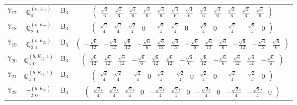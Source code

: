 \documentclass[fleqn,10pt,landscape]{article}
\begin{document}
\begin{itemize}
\begin{center}
\begin{longtable}{c|c|c|c}
$ \mathbb{Y}_{17} $ & $\mathbb{Q}_{0}^{(b,A_{1g})}$ & B$_{3}$ & $\begin{pmatrix} \frac{\sqrt{3}}{6} & \frac{\sqrt{3}}{6} & \frac{\sqrt{3}}{6} & \frac{\sqrt{3}}{6} & \frac{\sqrt{3}}{6} & \frac{\sqrt{3}}{6} & \frac{\sqrt{3}}{6} & \frac{\sqrt{3}}{6} & \frac{\sqrt{3}}{6} & \frac{\sqrt{3}}{6} & \frac{\sqrt{3}}{6} & \frac{\sqrt{3}}{6} \end{pmatrix}$ \\
$ \mathbb{Y}_{18} $ & $\mathbb{Q}_{2,0}^{(b,E_{2g})}$ & B$_{3}$ & $\begin{pmatrix} \frac{\sqrt{2}}{4} & \frac{\sqrt{2}}{4} & \frac{\sqrt{2}}{4} & 0 & - \frac{\sqrt{2}}{4} & \frac{\sqrt{2}}{4} & 0 & - \frac{\sqrt{2}}{4} & 0 & - \frac{\sqrt{2}}{4} & - \frac{\sqrt{2}}{4} & 0 \end{pmatrix}$ \\
$ \mathbb{Y}_{19} $ & $\mathbb{Q}_{2,1}^{(b,E_{2g})}$ & B$_{3}$ & $\begin{pmatrix} - \frac{\sqrt{6}}{12} & - \frac{\sqrt{6}}{12} & \frac{\sqrt{6}}{12} & - \frac{\sqrt{6}}{6} & \frac{\sqrt{6}}{12} & \frac{\sqrt{6}}{12} & - \frac{\sqrt{6}}{6} & \frac{\sqrt{6}}{12} & \frac{\sqrt{6}}{6} & - \frac{\sqrt{6}}{12} & - \frac{\sqrt{6}}{12} & \frac{\sqrt{6}}{6} \end{pmatrix}$ \\
$ \mathbb{Y}_{20} $ & $\mathbb{Q}_{4,0}^{(b,E_{2g},1)}$ & B$_{3}$ & $\begin{pmatrix} \frac{\sqrt{6}}{12} & \frac{\sqrt{6}}{12} & \frac{\sqrt{6}}{12} & - \frac{\sqrt{6}}{6} & \frac{\sqrt{6}}{12} & \frac{\sqrt{6}}{12} & - \frac{\sqrt{6}}{6} & \frac{\sqrt{6}}{12} & - \frac{\sqrt{6}}{6} & \frac{\sqrt{6}}{12} & \frac{\sqrt{6}}{12} & - \frac{\sqrt{6}}{6} \end{pmatrix}$ \\
$ \mathbb{Y}_{21} $ & $\mathbb{Q}_{4,1}^{(b,E_{2g},1)}$ & B$_{3}$ & $\begin{pmatrix} \frac{\sqrt{2}}{4} & \frac{\sqrt{2}}{4} & - \frac{\sqrt{2}}{4} & 0 & \frac{\sqrt{2}}{4} & - \frac{\sqrt{2}}{4} & 0 & \frac{\sqrt{2}}{4} & 0 & - \frac{\sqrt{2}}{4} & - \frac{\sqrt{2}}{4} & 0 \end{pmatrix}$ \\
$ \mathbb{Y}_{22} $ & $\mathbb{T}_{2,0}^{(b,E_{2g})}$ & B$_{3}$ & $\begin{pmatrix} \frac{\sqrt{2} i}{4} & \frac{\sqrt{2} i}{4} & \frac{\sqrt{2} i}{4} & 0 & - \frac{\sqrt{2} i}{4} & \frac{\sqrt{2} i}{4} & 0 & - \frac{\sqrt{2} i}{4} & 0 & - \frac{\sqrt{2} i}{4} & - \frac{\sqrt{2} i}{4} & 0 \end{pmatrix}$ \\

\end{longtable}
\end{center}
\end{itemize}
\end{document}
